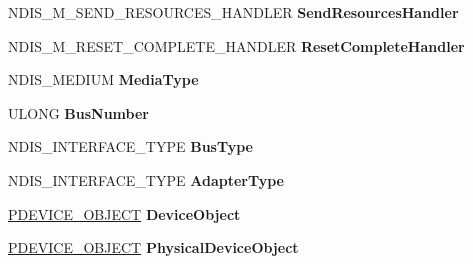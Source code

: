 \begin{DoxyCompactItemize}
\item 
\mbox{\label{struct___n_d_i_s___m_i_n_i_p_o_r_t___b_l_o_c_k_ae988813ab9e260b22aa59ab8620d082f}} 
N\+D\+I\+S\+\_\+\+M\+\_\+\+S\+E\+N\+D\+\_\+\+R\+E\+S\+O\+U\+R\+C\+E\+S\+\_\+\+H\+A\+N\+D\+L\+ER {\bfseries Send\+Resources\+Handler}
\item 
\mbox{\label{struct___n_d_i_s___m_i_n_i_p_o_r_t___b_l_o_c_k_a95e4ec9539332b3296561a0fde502790}} 
N\+D\+I\+S\+\_\+\+M\+\_\+\+R\+E\+S\+E\+T\+\_\+\+C\+O\+M\+P\+L\+E\+T\+E\+\_\+\+H\+A\+N\+D\+L\+ER {\bfseries Reset\+Complete\+Handler}
\item 
\mbox{\label{struct___n_d_i_s___m_i_n_i_p_o_r_t___b_l_o_c_k_a107e09d6e7b0771e1aef04139c38c488}} 
N\+D\+I\+S\+\_\+\+M\+E\+D\+I\+UM {\bfseries Media\+Type}
\item 
\mbox{\label{struct___n_d_i_s___m_i_n_i_p_o_r_t___b_l_o_c_k_a4bf7f590e17a70694a6e9bb5a182ecd6}} 
U\+L\+O\+NG {\bfseries Bus\+Number}
\item 
\mbox{\label{struct___n_d_i_s___m_i_n_i_p_o_r_t___b_l_o_c_k_ac4e67b20260b0ba3169543750dec10c0}} 
N\+D\+I\+S\+\_\+\+I\+N\+T\+E\+R\+F\+A\+C\+E\+\_\+\+T\+Y\+PE {\bfseries Bus\+Type}
\item 
\mbox{\label{struct___n_d_i_s___m_i_n_i_p_o_r_t___b_l_o_c_k_ac4755e9b14cc9b72742fc999d28e8b1d}} 
N\+D\+I\+S\+\_\+\+I\+N\+T\+E\+R\+F\+A\+C\+E\+\_\+\+T\+Y\+PE {\bfseries Adapter\+Type}
\item 
\mbox{\label{struct___n_d_i_s___m_i_n_i_p_o_r_t___b_l_o_c_k_a94b17a87b5872fee6777e7b259ef736b}} 
\hyperlink{struct___d_e_v_i_c_e___o_b_j_e_c_t}{P\+D\+E\+V\+I\+C\+E\+\_\+\+O\+B\+J\+E\+CT} {\bfseries Device\+Object}
\item 
\mbox{\label{struct___n_d_i_s___m_i_n_i_p_o_r_t___b_l_o_c_k_aa705c51dcb987d04ab2b35bb19badd06}} 
\hyperlink{struct___d_e_v_i_c_e___o_b_j_e_c_t}{P\+D\+E\+V\+I\+C\+E\+\_\+\+O\+B\+J\+E\+CT} {\bfseries Physical\+Device\+Object}

\end{DoxyCompactItemize}
